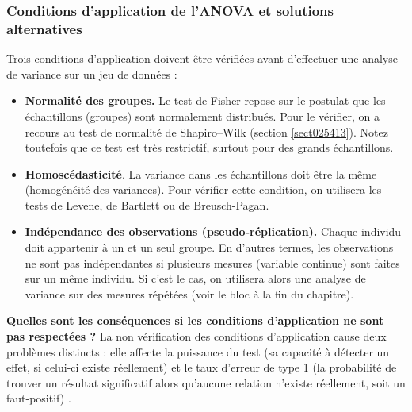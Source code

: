 \documentclass[
  11pt,
  french,
]{book}
\begin{document}
\hypertarget{sect04414}{%
\subsubsection{Conditions d'application de l'ANOVA et solutions alternatives}\label{sect04414}}

Trois conditions d'application doivent être vérifiées avant d'effectuer une analyse de variance sur un jeu de données :

\begin{itemize}
\item
  \textbf{Normalité des groupes.} Le test de Fisher repose sur le postulat que les échantillons (groupes) sont normalement distribués. Pour le vérifier, on a recours au test de normalité de Shapiro--Wilk (section \ref{sect025413}). Notez toutefois que ce test est très restrictif, surtout pour des grands échantillons.
\item
  \textbf{Homoscédasticité}. La variance dans les échantillons doit être la même (homogénéité des variances). Pour vérifier cette condition, on utilisera les tests de Levene, de Bartlett ou de Breusch-Pagan.
\item
  \textbf{Indépendance des observations (pseudo-réplication).} Chaque individu doit appartenir à un et un seul groupe. En d'autres termes, les observations ne sont pas indépendantes si plusieurs mesures (variable continue) sont faites sur un même individu. Si c'est le cas, on utilisera alors une analyse de variance sur des mesures répétées (voir le bloc à la fin du chapitre).
\end{itemize}

\textbf{Quelles sont les conséquences si les conditions d'application ne sont pas respectées ?} La non vérification des conditions d'application cause deux problèmes distincts : elle affecte la puissance du test (sa capacité à détecter un effet, si celui-ci existe réellement) et le taux d'erreur de type 1 (la probabilité de trouver un résultat significatif alors qu'aucune relation n'existe réellement, soit un faut-positif) \citep{glass1972consequences, lix1996consequences}.
\end{document}

